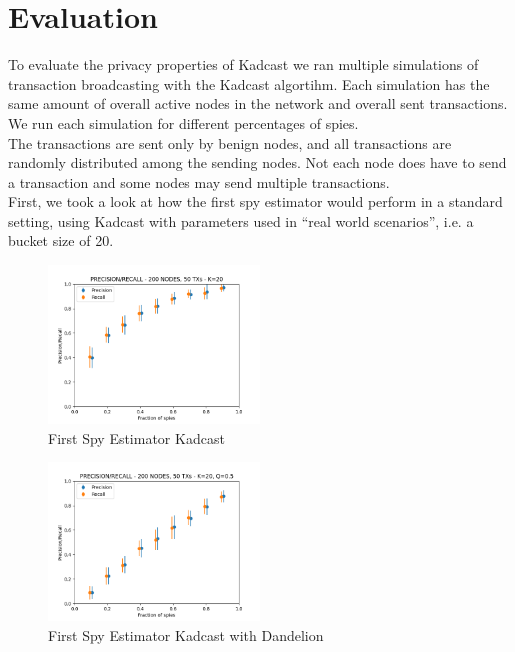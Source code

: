 \section{Evaluation}
To evaluate the privacy properties of Kadcast we ran multiple simulations of
transaction broadcasting with the Kadcast algortihm. Each simulation has
the same amount of overall active nodes in the network and overall sent transactions.
We run each simulation for different percentages of spies. \\
The transactions are sent only by benign nodes, and all transactions are
randomly distributed among the sending nodes. Not each node does have to
send a transaction and some nodes may send multiple transactions. \\

First, we took a look at how the first spy estimator would perform in a standard setting,
using Kadcast with parameters used in ``real world scenarios'', i.e. a
bucket size of 20. \\

\begin{figure}
  \centering
      \includegraphics[width=0.5\textwidth]{figs/nodand}
  \caption{First Spy Estimator Kadcast}
  \label{fig:nodand}
\end{figure}

\begin{figure}
  \centering
      \includegraphics[width=0.5\textwidth]{figs/dand05}
  \caption{First Spy Estimator Kadcast with Dandelion}
  \label{fig:dand}
\end{figure}

